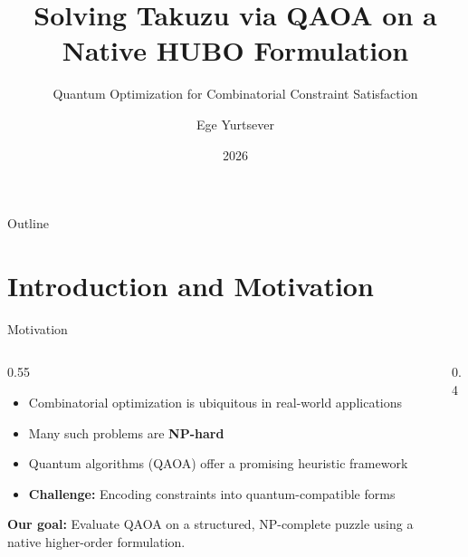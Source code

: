 \documentclass[aspectratio=169]{beamer}
\title{Solving Takuzu via QAOA on a Native HUBO Formulation}
\subtitle{Quantum Optimization for Combinatorial Constraint Satisfaction}
\author{Ege Yurtsever}
\institute{Sabanc\i{} University}
\date{2026}
\begin{document}
\begin{frame}
  \titlepage
\end{frame}

\begin{frame}{Outline}
  \tableofcontents
\end{frame}

\section{Introduction and Motivation}

\begin{frame}{Motivation}

\begin{columns}
\begin{column}{0.55\textwidth}
\begin{itemize}
    \item Combinatorial optimization is ubiquitous in real-world applications
    \item Many such problems are \textbf{NP-hard}
    \item Quantum algorithms (QAOA) offer a promising heuristic framework
    \item \textbf{Challenge:} Encoding constraints into quantum-compatible forms
\end{itemize}

\bigskip
\textbf{Our goal:} Evaluate QAOA on a structured, NP-complete puzzle using a native higher-order formulation.
\end{column}

\begin{column}{0.4\textwidth}
\centering
{}
\end{column}
\end{columns}
\end{frame}
\end{document}

